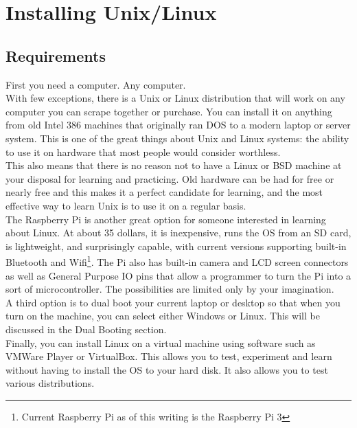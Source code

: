 \chapter{Installing Unix/Linux}

\section{Requirements}

First you need a computer.  Any computer.\\

With few exceptions, there is a Unix or Linux distribution that will work on any computer you can scrape together or purchase.  You can install it on anything from old Intel 386 machines that originally ran DOS to a modern laptop or server system.  This is one of the great things about Unix and Linux systems: the ability to use it on hardware that most people would consider worthless.\\

This also means that there is no reason not to have a Linux or BSD machine at your disposal for learning and practicing.  Old hardware can be had for free or nearly free and this makes it a perfect candidate for learning, and the most effective way to learn Unix is to use it on a regular basis.\\

The Raspberry Pi is another great option for someone interested in learning about Linux.  At about 35 dollars, it is inexpensive, runs the OS from an SD card, is lightweight, and surprisingly capable, with current versions supporting built-in Bluetooth and Wifi\footnote{Current Raspberry Pi as of this writing is the Raspberry Pi 3}.  The Pi also has built-in camera and LCD screen connectors as well as General Purpose IO pins that allow a programmer to turn the Pi into a sort of microcontroller.  The possibilities are limited only by your imagination.\\

A third option is to dual boot your current laptop or desktop so that when you turn on the machine, you can select either Windows or Linux.  This will be discussed in the Dual Booting section.\\

Finally, you can install Linux on a virtual machine using software such as VMWare Player or VirtualBox.  This allows you to test, experiment and learn without having to install the OS to your hard disk.  It also allows you to test various distributions.

